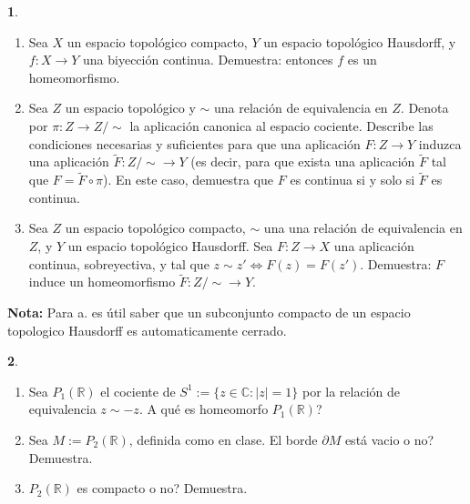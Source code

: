 \documentclass[12pt,a4paper]{report}
\theoremstyle{definition}
\newtheorem{ex}{}
\newcommand{\CC}{\ensuremath{\mathbb C}}
\newcommand{\RR}{\ensuremath{\mathbb R}}
\begin{document}
\begin{ex}
\begin{enumerate}
\item Sea $X$ un espacio topol\'ogico compacto, $Y$ un espacio topol\'ogico Hausdorff, y $f \colon X \to Y$ una biyecci\'on continua. Demuestra: entonces $f$ es un homeomorfismo.
\item Sea $Z$ un espacio topol\'ogico y $\sim$ una relaci\'on de equivalencia en $Z$. Denota por $\pi \colon Z \to Z/\sim$ la aplicaci\'on canonica al espacio cociente. Describe las condiciones necesarias y suficientes para que una aplicaci\'on $F \colon Z \to Y$ induzca una aplicaci\'on  $\tilde{F} \colon Z/\sim \to Y$ (es decir, para que exista una aplicaci\'on $\tilde{F}$ tal que $F=\tilde{F}\circ\pi$). En este caso, demuestra que $F$ es continua si y solo si $\tilde{F}$ es continua. 
\item Sea $Z$ un espacio topol\'ogico compacto, $\sim$ una una relaci\'on de equivalencia en $Z$, y $Y$   un espacio topol\'ogico Hausdorff. Sea $F \colon Z \to X$ una aplicaci\'on continua, sobreyectiva, y tal que $z\sim z' \Leftrightarrow F(z)=F(z')$. Demuestra: $F$ induce un homeomorfismo $\tilde{F} \colon Z/\sim 
\to Y$. 
\end{enumerate}
\textbf{Nota:} Para a. es \'util saber que un subconjunto compacto de un espacio topologico Hausdorff es automaticamente cerrado.
\end{ex}





\begin{ex}
\begin{enumerate}
\item Sea $P_1(\RR)$ el cociente de $S^1:=\{z\in \CC: |z|=1\}$ por la relaci\'on de equivalencia $z\sim -z$. A qu\'e es homeomorfo $P_1(\RR)$?
\item Sea $M:= P_2(\RR)$, definida como en clase. El borde $\partial M$ est\'a vacio o no? Demuestra.
\item $P_2(\RR)$ es compacto o no? Demuestra.\end{enumerate}
\end{ex}











 
\end{document}
